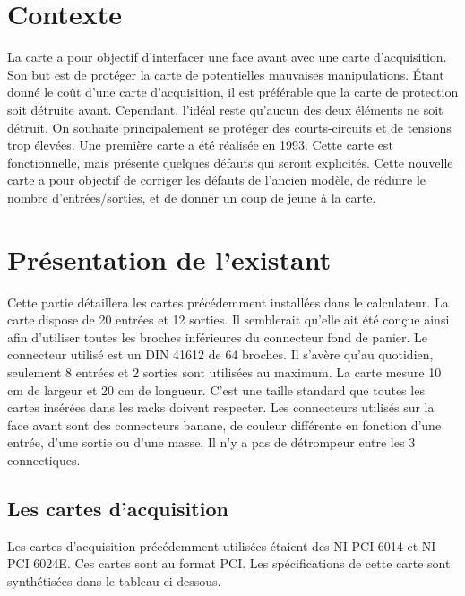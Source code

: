 \documentclass{report}
\begin{document}


\tableofcontents
\thispagestyle{empty}
\entete
\newpage
\thispagestyle{empty}
\listoffigures
\entete
\listoftables
\entete



\chapter{Contexte}
\thispagestyle{empty}
La carte a pour objectif d'interfacer une face avant avec une carte d'acquisition. Son but est de protéger la carte de potentielles mauvaises manipulations. Étant donné le coût d'une carte d'acquisition, il est préférable que la carte de protection soit détruite avant. Cependant, l'idéal reste qu'aucun des deux éléments ne soit détruit. On souhaite principalement se protéger des courts-circuits et de tensions trop élevées.
Une première carte a été réalisée en 1993. Cette carte est fonctionnelle, mais présente quelques défauts qui seront explicités. Cette nouvelle carte a pour objectif de corriger les défauts de l'ancien modèle, de réduire le nombre d'entrées/sorties, et de donner un coup de jeune à la carte.


\chapter{Présentation de l'existant}
\thispagestyle{empty}
Cette partie détaillera les cartes précédemment installées dans le calculateur. La carte dispose de 20 entrées et 12 sorties. Il semblerait qu'elle ait été conçue ainsi afin d'utiliser toutes les broches inférieures du connecteur fond de panier. Le connecteur utilisé est un DIN 41612 de 64 broches. Il s'avère qu'au quotidien, seulement 8 entrées et 2 sorties sont utilisées au maximum. La carte mesure 10 cm de largeur et 20 cm de longueur. C'est une taille standard que toutes les cartes insérées dans les racks doivent respecter. Les connecteurs utilisés sur la face avant sont des connecteurs banane, de couleur différente en fonction d'une entrée, d'une sortie ou d'une masse. Il n'y a pas de détrompeur entre les 3 connectiques.

\section{Les cartes d'acquisition}
Les cartes d'acquisition précédemment utilisées étaient des NI PCI 6014 et NI PCI 6024E. Ces cartes sont au format PCI. Les spécifications de cette carte sont synthétisées dans le tableau ci-dessous.
\end{document}
